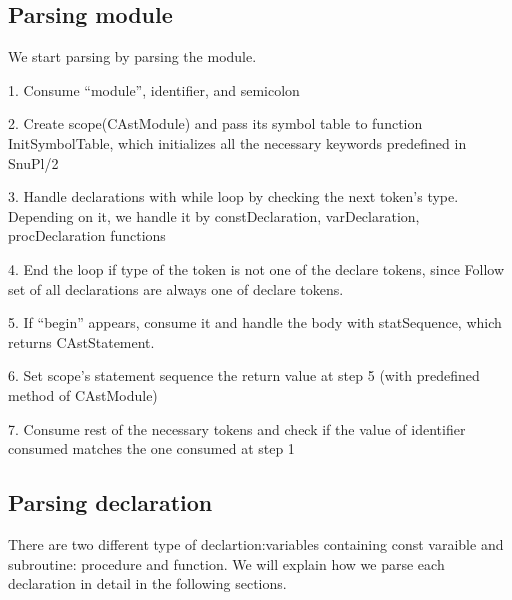 \documentclass[12pt]{article}
\begin{document}
\subsection{Parsing module}
\begin{MyIndentedList}
    \item We start parsing by parsing the module.
    \begin{MyIndentedList}
        \item 1.	Consume “module”, identifier, and semicolon
        \item 2.	Create scope(CAstModule) and pass its symbol table to function InitSymbolTable, which initializes all the necessary keywords predefined in SnuPl/2
        \item 3.	Handle declarations with while loop by checking the next token’s type. Depending on it, we handle it by constDeclaration, varDeclaration, procDeclaration functions
        \item 4.	End the loop if type of the token is not one of the declare tokens, since Follow set of all declarations are always one of declare tokens.
        \item 5.	 If “begin” appears, consume it and handle the body with statSequence, which returns CAstStatement.
        \item 6.	Set scope’s statement sequence the return value at step 5 (with predefined method of CAstModule)
        \item 7.	Consume rest of the necessary tokens and check if the value of identifier consumed matches the one consumed at step 1                
    \end{MyIndentedList}
\end{MyIndentedList}
\subsection{Parsing declaration}
There are two different type of declartion:variables containing const varaible and subroutine: procedure and function.
We will explain how we parse each declaration in detail in the following sections.
\end{document}
